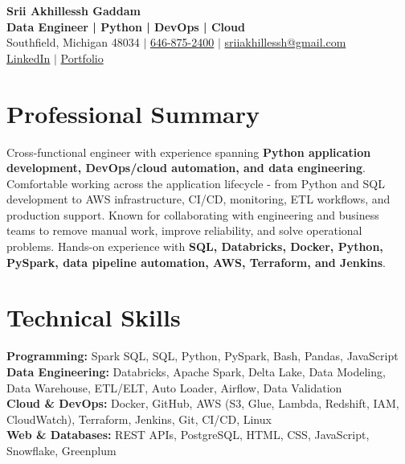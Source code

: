 \documentclass[letterpaper,10pt]{article}
\begin{document}
\fontsize{9.35pt}{10.45pt}\selectfont

\begin{center}
    {\LARGE \textbf{Srii Akhillessh Gaddam}} \\[-1pt]
    \textbf{Data Engineer | Python | DevOps | Cloud} \\[2pt]
    Southfield, Michigan 48034 $|$
    \href{tel:6468752400}{646-875-2400} $|$
    \href{mailto:sriiakhillessh@gmail.com}{sriiakhillessh@gmail.com} \\[1pt]
    \href{https://www.linkedin.com/in/srii-akhiilessh-gaddam-b48668191/}{LinkedIn} $|$
    \href{https://sriiakhillesshg.github.io/portfolio/}{Portfolio}
\end{center}
\vspace{-8pt}

\section{Professional Summary}
\small{Cross-functional engineer with experience spanning \textbf{Python application development, DevOps/cloud automation, and data engineering}. Comfortable working across the application lifecycle - from Python and SQL development to AWS infrastructure, CI/CD, monitoring, ETL workflows, and production support. Known for collaborating with engineering and business teams to remove manual work, improve reliability, and solve operational problems. Hands-on experience with \textbf{SQL, Databricks, Docker, Python, PySpark, data pipeline automation, AWS, Terraform, and Jenkins}.}

\section{Technical Skills}
\small{
\textbf{Programming:} Spark SQL, SQL, Python, PySpark, Bash, Pandas, JavaScript \\
\textbf{Data Engineering:} Databricks, Apache Spark, Delta Lake, Data Modeling, Data Warehouse, ETL/ELT, Auto Loader, Airflow, Data Validation \\
\textbf{Cloud \& DevOps:} Docker, GitHub, AWS (S3, Glue, Lambda, Redshift, IAM, CloudWatch), Terraform, Jenkins, Git, CI/CD, Linux \\
\textbf{Web \& Databases:} REST APIs, PostgreSQL, HTML, CSS, JavaScript, Snowflake, Greenplum
}
\end{document}
